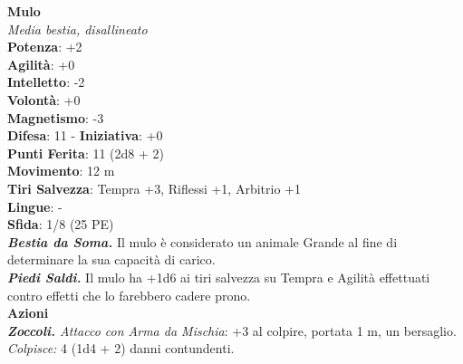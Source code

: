 \begin{multicols}{2}
\medskip\textbf{Mulo}\\
\emph{Media bestia, disallineato}\\
\textbf{Potenza}: +2\\
\textbf{Agilità}: +0\\
\textbf{Intelletto}: -2\\
\textbf{Volontà}: +0\\
\textbf{Magnetismo}: -3\\
\textbf{Difesa}: 11 - \textbf{Iniziativa}: +0\\
\textbf{Punti Ferita}: 11 (2d8 + 2)\\
\textbf{Movimento}: 12 m\\
\textbf{Tiri Salvezza}: Tempra +3, Riflessi +1, Arbitrio +1 \\
\textbf{Lingue}: -\\
\textbf{Sfida}: 1/8 (25 PE)\smallskip\\
\emph{\textbf{Bestia da Soma.}} Il mulo è considerato un animale Grande al fine di determinare la sua capacità di carico.\\
\emph{\textbf{Piedi Saldi.}} Il mulo ha +1d6 ai tiri salvezza su Tempra e Agilità effettuati contro effetti che lo farebbero cadere prono.\\
\smallskip\textbf{Azioni}\\
\emph{\textbf{Zoccoli.} Attacco con Arma da Mischia}: +3 al colpire, portata 1 m, un bersaglio.\\
\emph{Colpisce:} 4 (1d4 + 2) danni contundenti.\\



\end{multicols}
